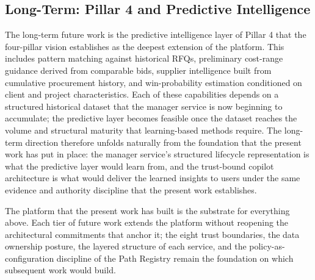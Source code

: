 \subsection*{Long-Term: Pillar 4 and Predictive Intelligence}
The long-term future work is the predictive intelligence layer of Pillar 4 that the four-pillar vision establishes as the deepest extension of the platform. This includes pattern matching against historical RFQs, preliminary cost-range guidance derived from comparable bids, supplier intelligence built from cumulative procurement history, and win-probability estimation conditioned on client and project characteristics. Each of these capabilities depends on a structured historical dataset that the manager service is now beginning to accumulate; the predictive layer becomes feasible once the dataset reaches the volume and structural maturity that learning-based methods require. The long-term direction therefore unfolds naturally from the foundation that the present work has put in place: the manager service's structured lifecycle representation is what the predictive layer would learn from, and the trust-bound copilot architecture is what would deliver the learned insights to users under the same evidence and authority discipline that the present work establishes.

The platform that the present work has built is the substrate for everything above. Each tier of future work extends the platform without reopening the architectural commitments that anchor it; the eight trust boundaries, the data ownership posture, the layered structure of each service, and the policy-as-configuration discipline of the Path Registry remain the foundation on which subsequent work would build.

